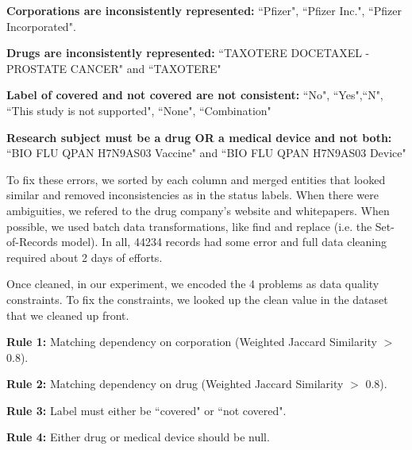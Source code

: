 \noindent \textbf{Corporations are inconsistently represented: } ``Pfizer", ``Pfizer Inc.", ``Pfizer Incorporated".

\vspace{0.25em}

\noindent \textbf{Drugs are inconsistently represented: } ``TAXOTERE  DOCETAXEL -PROSTATE CANCER" and ``TAXOTERE"

\vspace{0.25em}

\noindent \textbf{Label of covered and not covered are not consistent: } ``No", ``Yes",``N", ``This study is not supported", ``None", ``Combination"

\vspace{0.25em} 

\noindent \textbf{Research subject must be a drug OR a medical device and not both: } ``BIO FLU QPAN H7N9AS03 Vaccine" and ``BIO FLU QPAN H7N9AS03 Device"

\vspace{0.5em} 

To fix these errors, we sorted by each column and merged entities that looked similar and removed inconsistencies as in the status labels. 
When there were ambiguities, we refered to the drug company's website and whitepapers.
When possible, we used batch data transformations, like find and replace (i.e. the Set-of-Records model).
In all, 44234 records had some error and full data cleaning required about 2 days of efforts.

Once cleaned, in our experiment, we encoded the 4 problems as data quality constraints.
To fix the constraints, we looked up the clean value in the dataset that we cleaned up front.

\vspace{0.25em}

\noindent \textbf{Rule 1: } Matching dependency on corporation (Weighted Jaccard Similarity $>$ 0.8).

\vspace{0.25em}

\noindent \textbf{Rule 2: } Matching dependency on drug (Weighted Jaccard Similarity $>$ 0.8).

\vspace{0.25em}

\noindent \textbf{Rule 3: } Label must either be ``covered" or ``not covered".

\vspace{0.25em} 

\noindent \textbf{Rule 4: } Either drug or medical device should be null.


